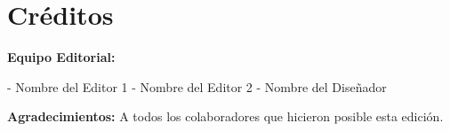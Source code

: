 \section*{Créditos}
\textbf{Equipo Editorial:}

- Nombre del Editor 1  
- Nombre del Editor 2  
- Nombre del Diseñador  

\textbf{Agradecimientos:}  
A todos los colaboradores que hicieron posible esta edición.
